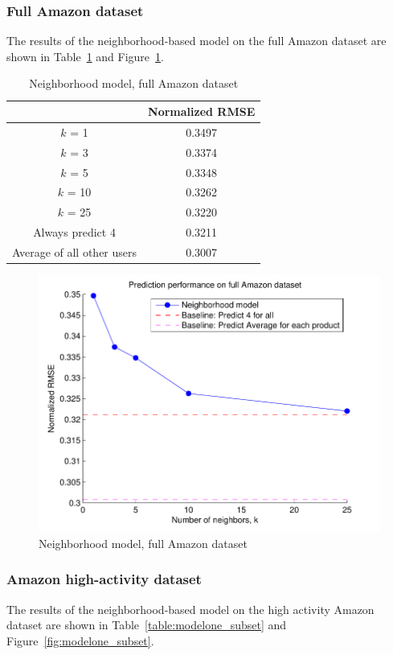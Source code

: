 \documentclass[letterpaper, 11 pt, conference]{ieeeconf}
\begin{document}
\subsubsection{Full Amazon dataset}
The results of the neighborhood-based model on the full Amazon dataset 
are shown in Table~\ref{table:modelone_full} and Figure~\ref{fig:modelone_full}.

\begin{table}[htb]
\centering
\begin{tabular}{|c|c|}
\cline{2-2}

\multicolumn{1}{c|}{}  & {Normalized RMSE} \tabularnewline \hline
$k$ = 1 & 0.3497  \tabularnewline
$k$ = 3 &  0.3374 \tabularnewline
$k$ = 5 & 0.3348  \tabularnewline
$k$ = 10 & 0.3262  \tabularnewline
$k$ = 25  & 0.3220  \tabularnewline
\hline
Always predict 4 & 0.3211 \tabularnewline 
Average of all other users & 0.3007 \tabularnewline

\hline
\end{tabular}
\caption{Neighborhood model, full Amazon dataset}
\label{table:modelone_full}
\end{table}

\begin{figure}[h]
\includegraphics[scale=0.6]{images/modelone_full.pdf}
\caption{Neighborhood model, full Amazon dataset}
\label{fig:modelone_full}
\end{figure}

\subsubsection{Amazon high-activity dataset}
The results of the neighborhood-based model on the high activity Amazon dataset 
are shown in Table~\ref{table:modelone_subset} and 
Figure~\ref{fig:modelone_subset}.
\end{document}
